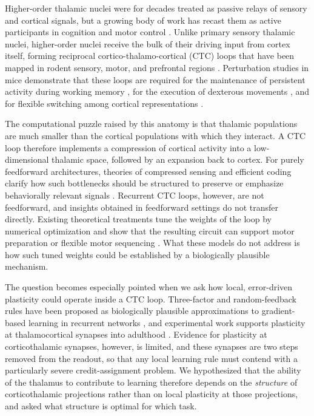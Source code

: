 \documentclass[11pt]{article}
\begin{document}
Higher-order thalamic nuclei were for decades treated as passive relays
of sensory and cortical signals, but a growing body of work has
recast them as active participants in cognition and motor control
\cite{sherman2007thalamic, sherman2016thalamus,
halassa2019thalamocortical}. Unlike primary sensory thalamic nuclei,
higher-order nuclei receive the bulk of their driving input from cortex
itself, forming reciprocal cortico-thalamo-cortical (CTC) loops that
have been mapped in rodent sensory, motor, and prefrontal regions
\cite{yamawaki2015synaptic, economo2018distinct, collins2018reciprocal,
guo2018anterolateral}. Perturbation studies in mice demonstrate that
these loops are required for the maintenance of persistent activity
during working memory \cite{guo2017maintenance, bolkan2017thalamic,
schmitt2017thalamic}, for the execution of dexterous movements
\cite{sauerbrei2020cortical}, and for flexible switching among cortical
representations \cite{rikhye2018thalamic, alcaraz2018thalamocortical}.

The computational puzzle raised by this anatomy is that thalamic
populations are much smaller than the cortical populations with which
they interact. A CTC loop therefore implements a compression of cortical
activity into a low-dimensional thalamic space, followed by an expansion
back to cortex. For purely feedforward architectures, theories of
compressed sensing and efficient coding clarify how such bottlenecks
should be structured to preserve or emphasize behaviorally relevant
signals \cite{ganguli2012compressed, olshausen1996emergence}. Recurrent
CTC loops, however, are not feedforward, and insights obtained in
feedforward settings do not transfer directly. Existing theoretical
treatments tune the weights of the loop by numerical optimization and
show that the resulting circuit can support motor preparation or
flexible motor sequencing \cite{kao2021optimal, logiaco2021thalamic}.
What these models do not address is how such tuned weights could be
established by a biologically plausible mechanism.

The question becomes especially pointed when we ask how local,
error-driven plasticity could operate inside a CTC loop. Three-factor
and random-feedback rules have been proposed as biologically plausible
approximations to gradient-based learning in recurrent networks
\cite{murray2019local, lillicrap2016random, gilra2017predicting,
miconi2017biologically, gerstner2018eligibility}, and experimental work
supports plasticity at thalamocortical synapses into adulthood
\cite{hasegawa2018thalamocortical}. Evidence for plasticity at
corticothalamic synapses, however, is limited, and these synapses are
two steps removed from the readout, so that any local learning rule
must contend with a particularly severe credit-assignment problem. We
hypothesized that the ability of the thalamus to contribute to learning
therefore depends on the \emph{structure} of corticothalamic projections
rather than on local plasticity at those projections, and asked what
structure is optimal for which task.
\end{document}
